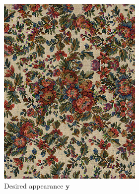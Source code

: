 \begin{figure}[]
    \centering    
    \begin{subfigure}{\textwidth}
        \centering
        \begin{subfigure}{0.2\textwidth}
            \centering
            \includegraphics[width=\textwidth]{images/04-experiment02/human/flowers/target.jpg}
            \caption*{Desired appearance \(\bm{y}\)}
        \end{subfigure}
        \hfill
        \begin{subfigure}{0.78\textwidth}
            \centering
            \begin{subfigure}{0.32\textwidth}
                \centering
                \begin{tikzpicture}

\end{tikzpicture}
\end{subfigure}
\end{subfigure}
\end{subfigure}
\end{figure}
